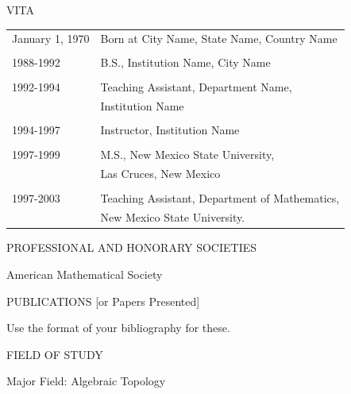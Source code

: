 \begin{center}
            VITA
\end{center}
\begin{flushleft}
\begin{tabular}{ll}
January 1, 1970 &  Born at City Name, State Name, Country Name
\\
& \\
1988-1992        &  B.S., Institution Name, City Name
\\
& \\
1992-1994        &  Teaching Assistant, Department Name,
\\
                 &  Institution Name
\\
& \\
1994-1997       &  Instructor, Institution Name
\\
& \\
1997-1999        &  M.S., New Mexico State University, 
\\               
                 &   Las  Cruces, New Mexico
\\
 & \\
1997-2003        &  Teaching Assistant, Department of Mathematics, 
\\               &  New Mexico State University. 
\end{tabular}
\end{flushleft}
\vspace{0.1in}
\begin{center}
PROFESSIONAL  AND HONORARY SOCIETIES
\end{center}
\begin{flushleft}
American Mathematical Society
\end{flushleft}
\vspace{0.1in}
\begin{center}PUBLICATIONS [or Papers Presented]
\end{center}
Use the format of your bibliography for these.
\begin{center}
FIELD OF STUDY
\end{center}
\begin{flushleft}
Major Field: Algebraic Topology
\end{flushleft}

